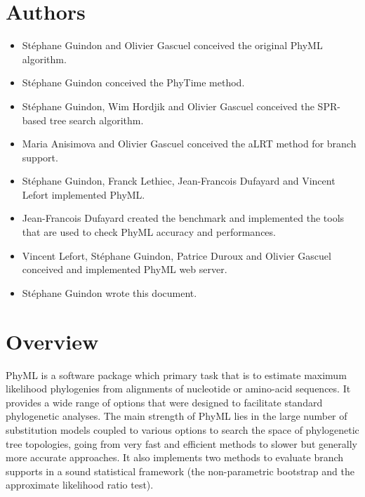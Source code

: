 \documentclass[a4paper,12pt]{article}
\begin{document}
{
\noindent
\setlength{\baselineskip}{0.7\baselineskip}
\section{Authors}
\begin{itemize}
\item { St\'ephane Guindon} and { Olivier Gascuel} conceived the original PhyML algorithm.
\item { St\'ephane Guindon} conceived the PhyTime method.
\item { St\'ephane Guindon, Wim Hordjik} and { Olivier Gascuel} conceived the SPR-based tree search algorithm.
\item { Maria Anisimova} and { Olivier Gascuel} conceived the aLRT method for branch support.
\item { St\'ephane Guindon, Franck Lethiec}, Jean-Francois Dufayard and Vincent Lefort implemented PhyML.
\item { Jean-Francois Dufayard} created the benchmark and implemented the tools that are used to check
  PhyML accuracy and performances. 
\item { Vincent Lefort, St\'ephane Guindon, Patrice Duroux} and { Olivier Gascuel} conceived and
  implemented PhyML web server.
\item St\'ephane Guindon wrote this document.
\end{itemize}
}
\clearpage

\section{Overview}

PhyML  \cite{guindon03} is  a  software  package which  primary  task that  is  to estimate  maximum
likelihood phylogenies  from alignments of nucleotide or  amino-acid sequences.  It  provides a wide
range  of  options that  were  designed  to facilitate  standard  phylogenetic  analyses.  The  main
strength of  PhyML lies in the  large number of substitution  models coupled to  various options to
search the  space of phylogenetic  tree topologies,  going from very  fast and efficient  methods to
slower but  generally more accurate approaches.  It  also implements two methods  to evaluate branch
supports  in  a  sound statistical  framework  (the  non-parametric  bootstrap and  the  approximate
likelihood ratio test).
\end{document}

